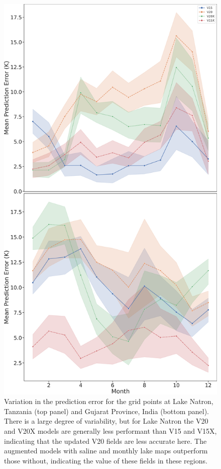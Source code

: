 \documentclass[hess, manuscript]{copernicus}
\begin{document}
	\begin{figure}
	\includegraphics[scale=0.2]{stacked_timeseries_lakes_new.png}
	\caption{Variation in the prediction error for the grid points at Lake Natron, Tanzania (top panel) and Gujarat Province, India (bottom panel). There is a large degree of variability, but for Lake Natron the V20 and V20X models are generally less performant than V15 and V15X, indicating that the updated V20 fields are less accurate here. The augmented models with saline and monthly lake maps outperform those without, indicating the value of these fields in these regions.} 
	\label{fig:timeseries_stacked}
\end{figure}
\end{document}
